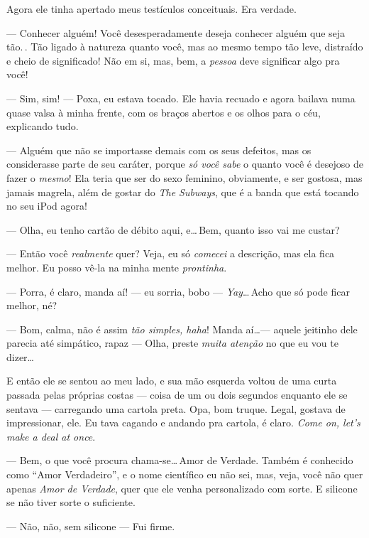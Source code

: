 Agora ele tinha apertado meus testículos conceituais. Era verdade.

--- Conhecer alguém! Você desesperadamente deseja conhecer alguém que seja tão.\,.\,\,Tão ligado à natureza quanto você, mas ao mesmo tempo tão leve, distraído e cheio de significado! Não em si, mas, bem, a \emph{pessoa} deve significar algo pra você!

--- Sim, sim! --- Poxa, eu estava tocado. Ele havia recuado e agora bailava numa quase valsa à minha frente, com os braços abertos e os olhos para o céu, explicando tudo.

--- Alguém que não se importasse demais com os seus defeitos, mas os considerasse parte de seu caráter, porque \emph{só você sabe} o quanto você é desejoso de fazer o \emph{mesmo}! Ela teria que ser do sexo feminino, obviamente, e ser gostosa, mas jamais magrela, além de gostar do \emph{The Subways}, que é a banda que está tocando no seu iPod agora!

--- Olha, eu tenho cartão de débito aqui, e\ldots\,Bem, quanto isso vai me custar?

--- Então você \emph{realmente} quer? Veja, eu só \emph{comecei} a descrição, mas ela fica melhor. Eu posso vê-la na minha mente \emph{prontinha}.

\begin{sloppypar}
--- Porra, é claro, manda aí! --- eu sorria, bobo --- \emph{Yay}\ldots\,Acho que só pode ficar melhor, né?
\end{sloppypar}

--- Bom, calma, não é assim \emph{tão simples, haha}! Manda aí\ldots --- aquele jeitinho dele parecia até simpático, rapaz --- Olha, preste \emph{muita atenção} no que eu vou te dizer\ldots

E então ele se sentou ao meu lado, e sua mão esquerda voltou de uma curta passada pelas próprias costas --- coisa de um ou dois segundos enquanto ele se sentava --- carregando uma cartola preta. Opa, bom truque. Legal, gostava de impressionar, ele. Eu tava cagando e andando pra cartola, é claro. \foreignlanguage{english}{\emph{Come on, let's make a deal at once}}.

--- Bem, o que você procura chama-se\ldots\,Amor de Verdade. Também é conhecido como ``Amor Verdadeiro'', e o nome científico eu não sei, mas, veja, você não quer apenas \emph{Amor de Verdade}, quer que ele venha personalizado com sorte. E silicone se não tiver sorte o suficiente.

--- Não, não, sem silicone --- Fui firme.

